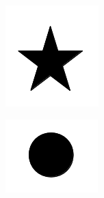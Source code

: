 \documentclass{article}
\begin{document}
\begin{itemize}
\begin{itemize}
      \begin{figure}[h!]
        \centering
        \begin{subfigure}[b]{0.2\textwidth}
          \includegraphics[width=\textwidth]{star.png}
        \end{subfigure}
        \begin{subfigure}[b]{0.2\textwidth}
          \includegraphics[width=\textwidth]{circle.png}

\end{subfigure}
\end{figure}
\end{itemize}
\end{itemize}
\end{document}

